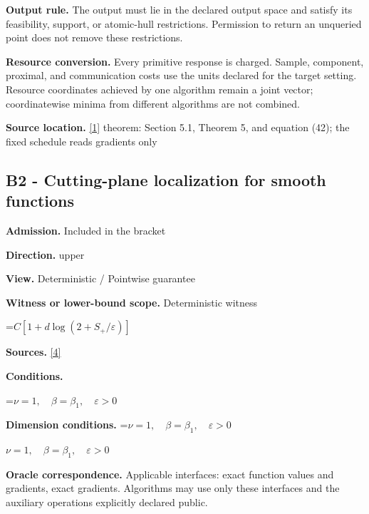 \documentclass[10pt,a4paper]{article}
\newcommand{\AtlasMath}[1]{\par\begingroup\centering\setbox0=\hbox{$\displaystyle #1$}\ifdim\wd0>1.4\linewidth\typeout{ATLAS WIDE FORMULA: \the\wd0}\fi\ifdim\wd0>\linewidth\resizebox{\linewidth}{!}{\box0}\else\box0\fi\par\endgroup}
\newcommand{\AtlasInlineMath}[1]{\begingroup\setbox0=\hbox{$#1$}\ifdim\wd0>.4\linewidth\endgroup\AtlasMath{#1}\else\endgroup$#1$\fi}
\begin{document}
\textbf{Output rule.} The output must lie in the declared output space and satisfy its feasibility, support, or atomic-hull restrictions. Permission to return an unqueried point does not remove these restrictions.



\textbf{Resource conversion.} Every primitive response is charged. Sample, component, proximal, and communication costs use the units declared for the target setting. Resource coordinates achieved by one algorithm remain a joint vector; coordinatewise minima from different algorithms are not combined.



\textbf{Source location.} \href{https://optimization-online.org/wp-content/uploads/2010/12/2865.pdf}{[1]} theorem: Section 5.1, Theorem 5, and equation (42); the fixed schedule reads gradients only



\subsection{B2 - Cutting-plane localization for smooth functions}


\textbf{Admission.} Included in the bracket



\textbf{Direction.} upper



\textbf{View.} Deterministic / Pointwise guarantee



\textbf{Witness or lower-bound scope.} Deterministic witness



\AtlasMath{C[1+d\log(2+S_+/\varepsilon)]}


\textbf{Sources.} \href{https://arxiv.org/pdf/2609.32910}{[4]}



\textbf{Conditions.}
\AtlasMath{\nu=1,\quad\beta=\beta_1,\quad\varepsilon>0}




\textbf{Dimension conditions.} \AtlasInlineMath{\nu=1,\quad\beta=\beta_1,\quad\varepsilon>0}



\textbf{Oracle correspondence.} Applicable interfaces: exact function values and gradients, exact gradients. Algorithms may use only these interfaces and the auxiliary operations explicitly declared public.
\end{document}
